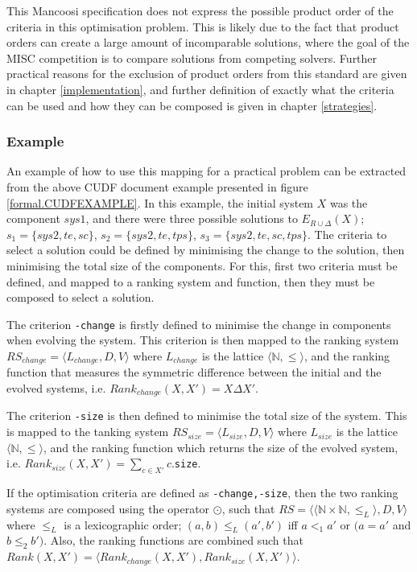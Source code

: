 This Mancoosi specification does not express the possible product order of the criteria in this optimisation problem.
This is likely due to the fact that product orders can create a large amount of incomparable solutions,
where the goal of the MISC competition is to compare solutions from competing solvers.
Further practical reasons for the exclusion of product orders from this standard are given in chapter \ref{implementation},
and further definition of exactly what the criteria can be used and how they can be composed is given in chapter \ref{strategies}.

\subsubsection{Example}
An example of how to use this mapping for a practical problem can be extracted from the above CUDF document example presented in figure \ref{formal.CUDFEXAMPLE}.
In this example, the initial system $X$ was the component $sys1$, and there were three possible solutions to $E_{R \cup \Delta}(X)$;
$s_1 = \{sys2, te, sc\}$,
$s_2 = \{sys2, te, tps\}$,
$s_3 = \{sys2, te, sc, tps\}$.
The criteria to select a solution could be defined by minimising the change to the solution, then minimising the total size of the components.
For this, first two criteria must be defined, and mapped to a ranking system and function, then they must be composed to select a solution.

The criterion \verb+-change+ is firstly defined to minimise the change in components when evolving the system.
This criterion is then mapped to the ranking system $RS_{change} = \langle L_{change},D,V \rangle$ where  $L_{change}$ is the lattice $\langle \mathbb{N}, \leq \rangle$,
and the ranking function that measures the symmetric difference between the initial and the evolved systems, i.e. $Rank_{change}(X,X') = X \Delta X'$.

The criterion \verb+-size+ is then defined to minimise the total size of the system.
This is mapped to the tanking system $RS_{size} = \langle L_{size},D,V \rangle$ where  $L_{size}$ is the lattice  $\langle \mathbb{N}, \leq \rangle$,
and the ranking function which returns the size of the evolved system, i.e.  $Rank_{size}(X,X') = \sum_{c \in X'} c$.\verb+size+.

If the optimisation criteria are defined as \verb+-change,-size+, then the two ranking systems are composed using the operator $\odot$,
such that $RS = \langle \langle \mathbb{N} \times \mathbb{N}, \leq_L \rangle, D, V \rangle$ where $\leq_L$ is a lexicographic order;
$(a,b) \leq_{L} (a',b')$ iff $a <_{1} a'$ or $(a = a'$ and $b \leq_{2} b')$.
Also, the ranking functions are combined such that $Rank(X,X') = \langle Rank_{change}(X,X'), Rank_{size}(X,X') \rangle$.

